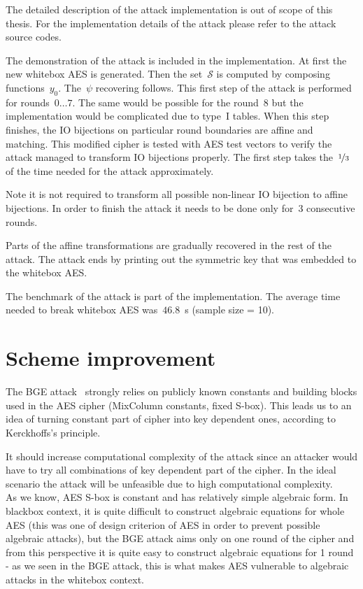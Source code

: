 \documentclass[11pt,oneside,final]{fithesis2}
\begin{document}
    The detailed description of the attack implementation is out of scope of this thesis. For the implementation details of the attack please refer to the attack 
    source codes.

    The demonstration of the attack is included in the implementation. At first the new whitebox AES is generated. Then the set~$\mathcal{S}$ is computed
    by composing functions~$y_0$. The~$\psi$ recovering follows. This first step of the attack is performed for rounds~$0\dots7$. The same would be possible for 
    the round~$8$ but the implementation would be complicated due to type~I tables. When this step finishes, the IO bijections on particular round boundaries
    are affine and matching. This modified cipher is tested with AES test vectors to verify the attack managed to transform IO bijections properly. 
    The first step takes the~$\nicefrac{1}{3}$ of the time needed for the attack approximately.
    
    Note it is not required to transform all possible non-linear IO bijection to affine bijections. In order to finish the attack it needs to be done only for~3 consecutive rounds.
    
    Parts of the affine transformations are gradually recovered in the rest of the attack. The attack ends by printing out the symmetric key that was embedded to the whitebox AES.
    
    The benchmark of the attack is part of the implementation. The average time needed to break whitebox AES was~$46.8$~s (sample size = 10).
    
    \chapter{Scheme improvement}
    The BGE attack~\citep{Billet:2004:CWB:2080787.2080809} strongly relies on publicly known constants and building blocks used in the AES cipher (MixColumn constants, fixed S-box). 
    This leads us to an idea of turning constant part of cipher into key dependent ones, according to Kerckhoffs's principle. 

    It should increase computational complexity of the attack since an attacker would have to try
    all combinations of key dependent part of the cipher. In the ideal scenario the attack will be unfeasible due to high computational complexity. \\
    
    As we know, AES S-box is constant and has relatively simple algebraic form. In blackbox context, it is quite difficult to construct algebraic equations for whole AES (this was 
    one of design criterion of AES in order to prevent possible algebraic attacks), but the BGE attack aims only on one round of the cipher and from this perspective it is 
    quite easy to construct algebraic equations for 1 round - as we seen in the BGE attack, this is what makes AES vulnerable to algebraic attacks in the whitebox context.\\
    
\end{document}
